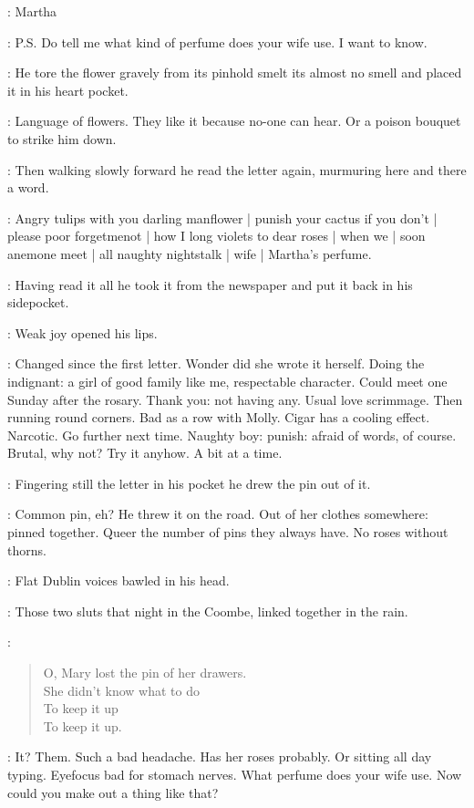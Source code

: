 \martha:
Martha

\martha:
P.S. Do tell me what kind of perfume does your wife use.
I want to know.

:
He tore the flower gravely from its pinhold
smelt its almost no smell
and placed it in his heart pocket.

\BloomInt:
Language of flowers.
They like it
because no-one can hear.
Or a poison bouquet to strike him down.

:
Then walking slowly forward
he read the letter again,
murmuring here and there a word.

\BloomInt:
Angry tulips with you darling manflower |
punish your cactus if you don't |
please poor forgetmenot |
how I long violets to dear roses |
when we |
soon anemone meet |
all naughty nightstalk |
wife |
Martha's perfume.

:
Having read it all
he took it from the newspaper and put it back in his sidepocket.

:
Weak joy opened his lips.

\BloomInt:
Changed since the first letter.
Wonder did she wrote it herself.
Doing the indignant:
a girl of good family like me, respectable character.
Could meet one Sunday after the rosary.
Thank you: not having any.
Usual love scrimmage.
Then running round corners.
Bad as a row with Molly.
Cigar has a cooling effect.
Narcotic.
Go further next time.
Naughty boy:
punish:
afraid of words, of course.
Brutal, why not?
Try it anyhow.
A bit at a time.

:
Fingering still the letter in his pocket
he drew the pin out of it.

\BloomInt:
Common pin, eh?
He threw it on the road.
Out of her clothes somewhere:
pinned together.
Queer the number of pins they always have.
No roses without thorns.

:
Flat Dublin voices bawled in his head.

\BloomInt:
Those two sluts that night in the Coombe, linked together in the rain.

\sluts:
\begin{verse}
    O, Mary lost the pin of her drawers. \\
    She didn't know what to do \\
    To keep it up \\
    To keep it up.
\end{verse}

\BloomInt:
It?
Them.
Such a bad headache.
Has her roses probably.
Or sitting all day typing.
Eyefocus bad for stomach nerves.
What perfume does your wife use.
Now could you make out a thing like that?

